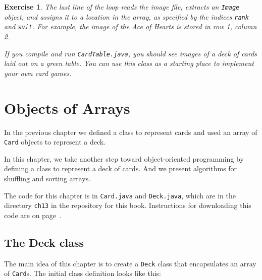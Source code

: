 \documentclass[12pt]{book}
\theoremstyle{exercise}
\newtheorem{exercise}{Exercise}[chapter]
\newcommand{\java}[1]{\verb"#1"}
\begin{document}
\begin{exercise}
The last line of the loop reads the image file, extracts an \java{Image} object, and assigns it to a location in the array, as specified by the indices \java{rank} and \java{suit}.
For example, the image of the Ace of Hearts is stored in row 1, column 2.

If you compile and run \java{CardTable.java}, you should see images of a deck of cards laid out on a green table.
You can use this class as a starting place to implement your own card games.



\end{exercise}



\chapter{Objects of Arrays}
\label{Deck}


In the previous chapter we defined a class to represent cards and used an array of \java{Card} objects to represent a deck.

In this chapter, we take another step toward object-oriented programming by defining a class to represent a deck of cards.
And we present algorithms for shuffling and sorting arrays.



The code for this chapter is in \java{Card.java} and \java{Deck.java}, which are in the directory {\tt ch13} in the repository for this book.
Instructions for downloading this code are on page~\pageref{code}.


\section{The Deck class}
\label{deck}

The main idea of this chapter is to create a \java{Deck} class that encapsulates an array of \java{Card}s.
The initial class definition looks like this:
\end{document}
